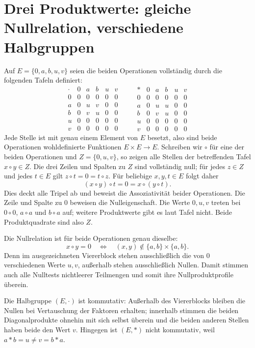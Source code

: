 \section{Drei Produktwerte: gleiche Nullrelation, verschiedene Halbgruppen}
\hypertarget{nullproducts.example.threevalues}{}

Auf \(E=\{0,a,b,u,v\}\) seien die beiden Operationen vollständig durch
die folgenden Tafeln definiert:
\[
\begin{array}{c|ccccc}
 \cdot&0&a&b&u&v\\\hline
 0&0&0&0&0&0\\
 a&0&u&v&0&0\\
 b&0&v&u&0&0\\
 u&0&0&0&0&0\\
 v&0&0&0&0&0
\end{array}
\qquad
\begin{array}{c|ccccc}
 \ast&0&a&b&u&v\\\hline
 0&0&0&0&0&0\\
 a&0&u&u&0&0\\
 b&0&v&u&0&0\\
 u&0&0&0&0&0\\
 v&0&0&0&0&0
\end{array}
\]
Jede Stelle ist mit genau einem Element von \(E\) besetzt, also sind
beide Operationen wohldefinierte Funktionen \(E\times E\to E\).
Schreiben wir \(\circ\) für eine der beiden Operationen und
\(Z=\{0,u,v\}\), so zeigen alle Stellen der betreffenden Tafel
\(x\circ y\in Z\). Die drei Zeilen und Spalten zu \(Z\) sind
vollständig null; für jedes \(z\in Z\) und jedes \(t\in E\) gilt
\(z\circ t=0=t\circ z\). Für beliebige \(x,y,t\in E\) folgt daher
\[
 (x\circ y)\circ t=0=x\circ(y\circ t).
\]
Dies deckt alle Tripel ab und beweist die Assoziativität beider
Operationen. Die Zeile und Spalte zu \(0\) beweisen die Nulleigenschaft.
Die Werte \(0,u,v\) treten bei \(0\circ0\), \(a\circ a\) und
\(b\circ a\) auf; weitere Produktwerte gibt es laut Tafel nicht.
Beide Produktquadrate sind also \(Z\).

Die Nullrelation ist für beide Operationen genau dieselbe:
\[
 x\circ y=0\quad\Longleftrightarrow\quad
 (x,y)\notin\{a,b\}\times\{a,b\}.
\]
Denn im ausgezeichneten Viererblock stehen ausschließlich die von \(0\)
verschiedenen Werte \(u,v\), außerhalb stehen ausschließlich Nullen.
Damit stimmen auch alle Nulltests nichtleerer Teilmengen und somit ihre
Nullproduktprofile überein.

Die Halbgruppe \((E,\cdot)\) ist kommutativ: Außerhalb des Viererblocks
bleiben die Nullen bei Vertauschung der Faktoren erhalten; innerhalb
stimmen die beiden Diagonalprodukte ohnehin mit sich selbst überein und
die beiden anderen Stellen haben beide den Wert \(v\). Hingegen ist
\((E,\ast)\) nicht kommutativ, weil \(a\ast b=u\ne v=b\ast a\).

